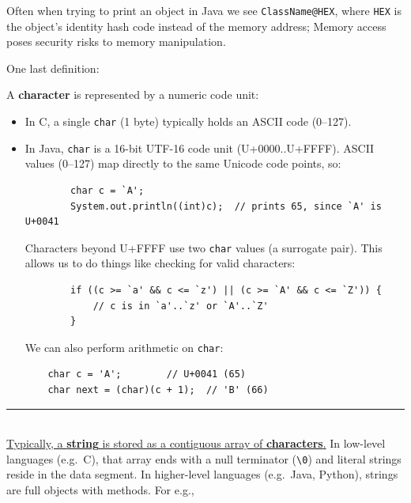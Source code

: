 \begin{Tip}
    Often when trying to print an object in Java we see \texttt{ClassName@HEX}, 
    where \texttt{HEX} is the object's identity hash code instead of the memory address; Memory access poses security risks to memory
    manipulation.
\end{Tip}

\newpage 

\noindent
One last definition:
\begin{Def}

    \noindent
    A \textbf{character} is represented by a numeric code unit:
    \begin{itemize}
      \item In C, a single \texttt{char} (1 byte) typically holds an ASCII code (0--127).
      \item In Java, \texttt{char} is a 16-bit UTF-16 code unit (U+0000..U+FFFF). ASCII values (0--127) map directly to the same Unicode code points, so:
      \begin{verbatim}
        char c = `A';
        System.out.println((int)c);  // prints 65, since `A' is U+0041
      \end{verbatim}
      
      \vspace{-1.5em}
      \noindent
      Characters beyond U+FFFF use two \texttt{char} values (a surrogate pair). This allows us to do things like checking for 
      valid characters:
      \begin{verbatim}
        if ((c >= `a' && c <= `z') || (c >= `A' && c <= `Z')) {
            // c is in `a'..`z' or `A'..`Z'
        }
    \end{verbatim}

    \vspace{-1.5em}
    \noindent
    We can also perform arithmetic on \texttt{char}:
    \begin{verbatim}
    char c = 'A';        // U+0041 (65)
    char next = (char)(c + 1);  // 'B' (66)
    \end{verbatim}
    \end{itemize}
    
    \vspace{-1.5em}
    \noindent
    \rule{\textwidth}{0.4pt}\\ 

    \noindent
    \underline{Typically, a \textbf{string} is stored as a contiguous array of \textbf{characters}.} In low-level languages (e.g.\ C),
    that array ends with a null terminator (\verb|\0|) and literal strings reside in the data segment. 
    In higher-level languages (e.g.\ Java, Python), strings are full objects with methods. For e.g.,\\


\end{Def}
